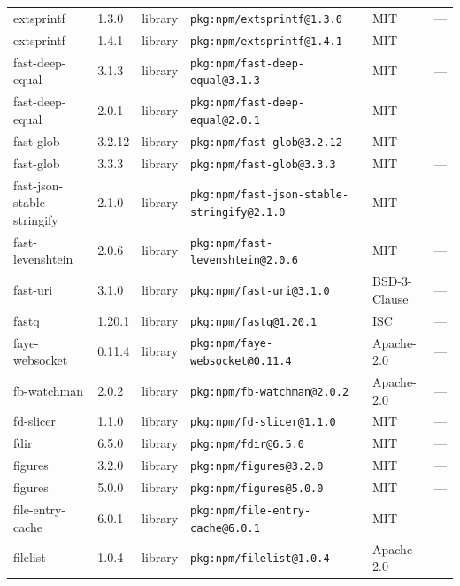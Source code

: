 \documentclass[11pt,a4paper]{article}
\begin{document}
\begin{longtable}{|p{4cm}|p{2cm}|p{1.6cm}|p{5cm}|p{1.5cm}|p{3.5cm}|}
\raggedright extsprintf & 1.3.0 & library & \small\texttt{pkg:npm/extsprintf@1.3.0} & MIT & \small — \\
\raggedright extsprintf & 1.4.1 & library & \small\texttt{pkg:npm/extsprintf@1.4.1} & MIT & \small — \\
\raggedright fast-deep-equal & 3.1.3 & library & \small\texttt{pkg:npm/fast-deep-equal@3.1.3} & MIT & \small — \\
\raggedright fast-deep-equal & 2.0.1 & library & \small\texttt{pkg:npm/fast-deep-equal@2.0.1} & MIT & \small — \\
\raggedright fast-glob & 3.2.12 & library & \small\texttt{pkg:npm/fast-glob@3.2.12} & MIT & \small — \\
\raggedright fast-glob & 3.3.3 & library & \small\texttt{pkg:npm/fast-glob@3.3.3} & MIT & \small — \\
\raggedright fast-json-stable-stringify & 2.1.0 & library & \small\texttt{pkg:npm/fast-json-stable-stringify@2.1.0} & MIT & \small — \\
\raggedright fast-levenshtein & 2.0.6 & library & \small\texttt{pkg:npm/fast-levenshtein@2.0.6} & MIT & \small — \\
\raggedright fast-uri & 3.1.0 & library & \small\texttt{pkg:npm/fast-uri@3.1.0} & BSD-3-Clause & \small — \\
\raggedright fastq & 1.20.1 & library & \small\texttt{pkg:npm/fastq@1.20.1} & ISC & \small — \\
\raggedright faye-websocket & 0.11.4 & library & \small\texttt{pkg:npm/faye-websocket@0.11.4} & Apache-2.0 & \small — \\
\raggedright fb-watchman & 2.0.2 & library & \small\texttt{pkg:npm/fb-watchman@2.0.2} & Apache-2.0 & \small — \\
\raggedright fd-slicer & 1.1.0 & library & \small\texttt{pkg:npm/fd-slicer@1.1.0} & MIT & \small — \\
\raggedright fdir & 6.5.0 & library & \small\texttt{pkg:npm/fdir@6.5.0} & MIT & \small — \\
\raggedright figures & 3.2.0 & library & \small\texttt{pkg:npm/figures@3.2.0} & MIT & \small — \\
\raggedright figures & 5.0.0 & library & \small\texttt{pkg:npm/figures@5.0.0} & MIT & \small — \\
\raggedright file-entry-cache & 6.0.1 & library & \small\texttt{pkg:npm/file-entry-cache@6.0.1} & MIT & \small — \\
\raggedright filelist & 1.0.4 & library & \small\texttt{pkg:npm/filelist@1.0.4} & Apache-2.0 & \small — \\

\end{longtable}
\end{document}
